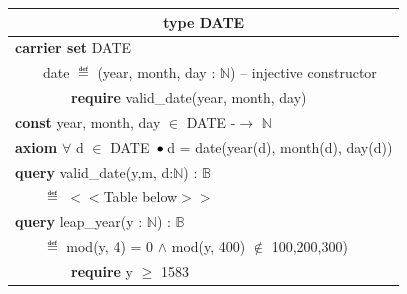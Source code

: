 \documentclass[runningheads,12pt]{article}
\begin{document}
\centering 
    
%

\begin{table}[H]
{
\centering
\begin{tabular}{|l|}

\hline
\multicolumn{1}{|c|}{\textbf{type DATE}}\\

\hline
\textbf{carrier set} DATE\\
$\qquad$date $\eqdef$ (year, month, day : $\mathbb{N}$)    -- injective constructor\\
$\qquad$$\qquad$\textbf{require} valid\_date(year, month, day)\\
\textbf{const} year, month, day $\in$ DATE -$\rightarrow$  $\mathbb{N}$\\
\textbf{axiom} $\forall$ d $\in$ DATE $ \,\bullet\,$d = date(year(d), month(d), day(d))\\
\textbf{query} valid\_date(y,m, d:$\mathbb{N}$) : $\mathbb{B}$\\
$\qquad$$\eqdef$ $<$$<$Table below$>$$>$\\
\textbf{query} leap\_year(y : $\mathbb{N}$) : $\mathbb{B}$\\
$\qquad$$\eqdef$ mod(y, 4) = 0 $\land$ mod(y, 400) $\notin$ {100,200,300)}\\
$\qquad$$\qquad$\textbf{require} y $\ge$ 1583\\


\hline
\end{tabular}
}
\end{table}
\end{document}
